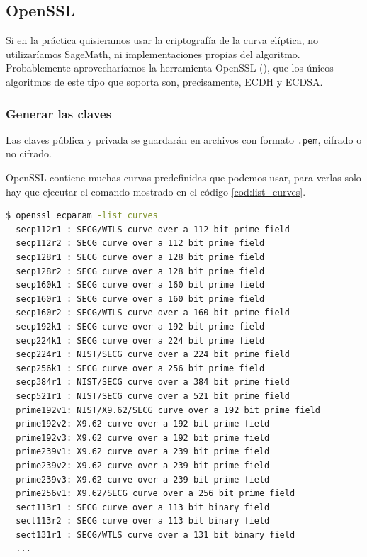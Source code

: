 \documentclass[11pt]{article}
\begin{document}
\subsection{OpenSSL}
Si en la práctica quisieramos usar la criptografía de la curva elíptica, no utilizaríamos SageMath, ni implementaciones propias del algoritmo. Probablemente aprovecharíamos la herramienta OpenSSL (\cite{noauthor_command_nodate}), que los únicos algoritmos de este tipo que soporta son, precisamente, ECDH y ECDSA.

\subsubsection*{Generar las claves}
Las claves pública y privada se guardarán en archivos con formato \texttt{.pem}, cifrado o no cifrado.

OpenSSL contiene muchas curvas predefinidas que podemos usar, para verlas solo hay que ejecutar el comando mostrado en el código \ref{cod:list_curves}.

\begin{lstlisting}[language=bash, label={cod:list_curves}, caption={OpenSSL: listar curvas por defecto}, morekeywords={list_curves}]
 $ openssl ecparam -list_curves
  secp112r1 : SECG/WTLS curve over a 112 bit prime field
  secp112r2 : SECG curve over a 112 bit prime field
  secp128r1 : SECG curve over a 128 bit prime field
  secp128r2 : SECG curve over a 128 bit prime field
  secp160k1 : SECG curve over a 160 bit prime field
  secp160r1 : SECG curve over a 160 bit prime field
  secp160r2 : SECG/WTLS curve over a 160 bit prime field
  secp192k1 : SECG curve over a 192 bit prime field
  secp224k1 : SECG curve over a 224 bit prime field
  secp224r1 : NIST/SECG curve over a 224 bit prime field
  secp256k1 : SECG curve over a 256 bit prime field
  secp384r1 : NIST/SECG curve over a 384 bit prime field
  secp521r1 : NIST/SECG curve over a 521 bit prime field
  prime192v1: NIST/X9.62/SECG curve over a 192 bit prime field
  prime192v2: X9.62 curve over a 192 bit prime field
  prime192v3: X9.62 curve over a 192 bit prime field
  prime239v1: X9.62 curve over a 239 bit prime field
  prime239v2: X9.62 curve over a 239 bit prime field
  prime239v3: X9.62 curve over a 239 bit prime field
  prime256v1: X9.62/SECG curve over a 256 bit prime field
  sect113r1 : SECG curve over a 113 bit binary field
  sect113r2 : SECG curve over a 113 bit binary field
  sect131r1 : SECG/WTLS curve over a 131 bit binary field
  ...
\end{lstlisting}
\end{document}
